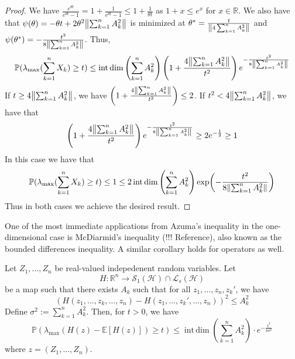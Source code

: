 \begin{proof}
    We have \( \frac{e^{\theta t}}{e^{\theta t }-1}=1+ \frac{1}{e^{\theta t}-1} \leq 1+ \frac{1}{\theta t} \) as \( 1+x \leq e^{x} \) for \( x \in \mathbb{R} \). We also have that \( \psi(\theta) = - \theta t + {2} \theta^{2} \norm{\sum_{k=1}^{n}A_k^{2}}_{} \) is minimized at \( \theta^{*}= \frac{t}{\norm{4\sum_{k=1}^{n}A_k^{2}}} \) and \( \psi(\theta^{*})= -\frac{t^{2}}{8 \norm{\sum_{k=1}^{n}A_k^{2}}} \). Thus,
    \[ \mathbb{P}(\lambda_{\text{max}} (\sum_{k=1}^{n}X_k) \geq t) \leq \operatorname{int\, dim}\left(\sum_{k=1}^{n} A_k^{2}\right) \left(1+ \frac{4\norm{\sum_{k=1}^{n}A_k^{2}}_{}}{t^{2}}\right) e^{-\frac{t^{2}}{8 \norm{ \sum_{k=1}^{n}A_k^{2}}_{}}} \]
    If  \( t \geq 4\norm{\sum_{k=1}^{n}A_k^{2}}_{} \), we have \( \left(1+\frac{4\norm{\sum_{k=1}^{n}A_k^{2}}_{}}{t^{2}}\right) \leq 2 \). If \( t^{2} < 4\norm{\sum_{k=1}^{n}A_k^{2}}_{} \), we have that 
    \[ \left(1+\frac{4\norm{\sum_{k=1}^{n}A_k^{2}}_{}}{t^{2}}\right) e^{-\frac{t^{2}}{8 \norm{\sum_{k=1}^{n}A_k^{2}}_{}}} \geq 2 e^{-\frac{1}{2}} \geq 1 \]
    In this case we have that 
    \[ \mathbb{P}(\lambda_{\text{max}} (\sum_{k=1}^{n}X_k) \geq t) \leq 1 \leq 2 \operatorname{int\, dim}\left(\sum_{k=1}^{n}A_k^{2}\right) \exp({- \frac{t^{2}}{8 \norm{\sum_{k=1}^{n}A_k^{2}}_{}}} )\]
    Thus in both cases we achieve the desired result.
\end{proof}

One of the most immediate applications from Azuma's inequality in the one-dimensional case is McDiarmid's inequality (!!! Reference), also known as the bounded differences inequality. A similar corollary holds for operators as well.


\begin{corl}
    Let \( Z_1,\dots, Z_n \) be real-valued indepedenent random variables. Let 
    \[ H: \mathbb{R}^{n} \to \mathcal{S}_1(\mathcal{H})\cap \mathcal{L}_s(\mathcal{H}) \]
    be a map such that there exists \( A_k \) such that for all \( z_1,\dots,z_n,z_k' \), we have 
    \[ \left(H(z_1,\dots,z_k,\dots,z_n)- H(z_1,\dots,z_k',\dots,z_n)\right)^2 \leq A_k^{2} \]
    Define \( \sigma^{2}:= \sum_{k=1}^{n}A_k^{2} \). Then, for \( t>0 \), we have
    \[ \mathbb{P}\left(\lambda_{\text{max}} \left(H(z)-\mathbb{E}[H(z)]\right) \geq t\right) \leq \operatorname{int\, dim}\left(\sum_{k=1}^{n}A_k^{2}\right) \cdot e^{-\frac{t^{2}}{8 \sigma^{2}}} \]
    where \( z=(Z_1,\dots,Z_n) \).
\end{corl}


